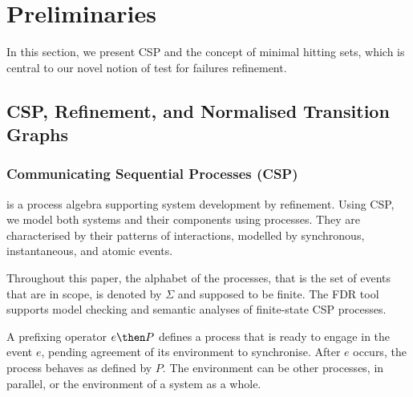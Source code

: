 \section{Preliminaries}
\label{section:preliminaries}

In this section, we present CSP and the concept of minimal hitting sets, which
is central to our novel notion of test for failures refinement.

\subsection{CSP, Refinement, and Normalised Transition Graphs}

\subsubsection*{Communicating Sequential Processes (CSP)} is a process algebra
supporting system development by refinement. Using CSP, we model both systems and
their components using processes. They are characterised by their patterns
of interactions, modelled by synchronous, instantaneous, and atomic events.

Throughout this paper, the alphabet of the processes, that is the set of
events that are in scope, is denoted by $\Sigma$ and supposed to be finite.
The FDR tool~\cite{fdr} supports model checking and semantic analyses of
finite-state CSP processes.


A prefixing operator $e \then P$ defines a process that is ready to engage in
the event $e$, pending agreement of its environment to synchronise. After $e$
occurs, the process behaves as defined by $P$. The environment can be other
processes, in parallel, or the environment of a system as a whole.

